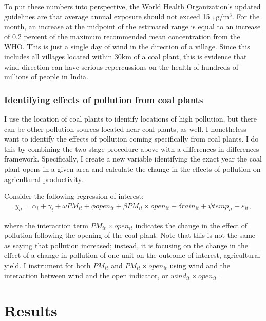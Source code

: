 \documentclass[
]{article}
\begin{document}
To put these numbers into perspective, the World Health Organization's updated guidelines are that average annual exposure should not exceed 15 \(\mathrm{\mu g/m^3}\). For the month, an increase at the midpoint of the estimated range is equal to an increase of 0.2 percent of the maximum recommended mean concentration from the WHO. This is just a single day of wind in the direction of a village. Since this includes all villages located within 30km of a coal plant, this is evidence that wind direction can have serious repercussions on the health of hundreds of millions of people in India.

\hypertarget{identifying-effects-of-pollution-from-coal-plants}{%
\subsubsection{Identifying effects of pollution from coal plants}\label{identifying-effects-of-pollution-from-coal-plants}}

I use the location of coal plants to identify locations of high pollution, but there can be other pollution sources located near coal plants, as well. I nonetheless want to identify the effects of pollution coming specifically from coal plants. I do this by combining the two-stage procedure above with a differences-in-differences framework. Specifically, I create a new variable identifying the exact year the coal plant opens in a given area and calculate the change in the effects of pollution on agricultural productivity.

Consider the following regression of interest:
\begin{gather} 
y_{it} = \alpha_{i} + \gamma_{t} + \omega PM_{it} + \phi open_{it} + \beta PM_{it}\times open_{it} + \delta rain_{it} + \psi temp_{it} + \varepsilon_{it},
\end{gather}

where the interaction term \(PM_{it}\times open_{it}\) indicates the change in the effect of pollution following the opening of the coal plant. Note that this is not the same as saying that pollution increased; instead, it is focusing on the change in the effect of a change in pollution of one unit on the outcome of interest, agricultural yield. I instrument for both \(PM_{it}\) and \(PM_{it}\times open_{it}\) using wind and the interaction between wind and the open indicator, or \(wind_{it}\times open_{it}\).

\hypertarget{results}{%
\section{Results}\label{results}}
\end{document}
